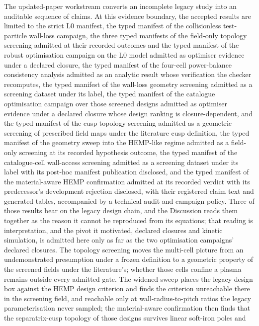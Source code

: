 \documentclass[11pt]{article}
\begin{document}
The updated-paper workstream converts an incomplete legacy study into an
auditable sequence of claims. At this evidence boundary, the accepted results
are limited to the strict L0 manifest, the typed manifest of the
collisionless test-particle wall-loss campaign, the three typed manifests
of the field-only topology screening admitted at their recorded outcomes and
the typed manifest of the robust optimisation campaign on the L0 model admitted
as optimiser evidence under a declared closure, the typed manifest of the
four-cell power-balance consistency analysis admitted as an analytic result
whose verification the checker recomputes, the typed manifest of the
wall-loss geometry screening admitted as a screening dataset under its label,
the typed manifest of the catalogue optimisation campaign over those
screened designs admitted as optimiser evidence under a declared closure whose
design ranking is closure-dependent, and the typed manifest of the cusp
topology screening admitted as a geometric screening of prescribed field maps
under the literature cusp definition, the typed manifest of the geometry
sweep into the HEMP-like regime admitted as a field-only screening at its recorded
hypothesis outcome, the typed manifest of the catalogue-cell wall-access
screening admitted as a screening dataset under its label with its post-hoc
manifest publication disclosed, and the typed manifest of the material-aware
HEMP confirmation admitted at its recorded verdict with its predecessor's
development rejection disclosed,
with their registered claim text and generated tables, accompanied by a
technical audit and campaign policy. Three of those results bear on the legacy design chain, and the
Discussion reads them together as the reason it cannot be reproduced from its
equations; that reading is interpretation, and the pivot it motivated, declared
closures and kinetic simulation, is admitted here only as far as the two
optimisation campaigns' declared closures. The topology screening moves the
multi-cell picture from an undemonstrated presumption under a frozen
definition to a geometric property of the screened fields under the
literature's; whether those cells confine a plasma remains outside every
admitted gate. The widened sweep places the legacy design box against the HEMP
design criterion and finds the criterion unreachable there in the screening
field, and reachable only at wall-radius-to-pitch ratios the legacy
parameterisation never sampled; the material-aware confirmation then finds that
the separatrix-cusp topology of those designs survives linear soft-iron poles and
\end{document}
